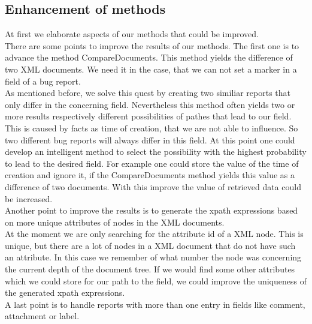 \subsection{Enhancement of methods}
At first we elaborate aspects of our methods that could be improved. \\
There are some points to improve the results of our methods. The first one is to advance the method CompareDocuments. This method yields the difference of two XML documents. We need it in the case, that we can not set a marker in a field of a bug report. \\ As mentioned before, we solve this quest by creating two similiar reports that only differ in the concerning field. Nevertheless this method often yields two or more results respectively different possibilities of pathes that lead to our field. This is caused by facts as time of creation, that we are not able to influence. So two different bug reports will always differ in this field. At this point one could develop an intelligent method to select the possibility with the highest probability to lead to the desired field. For example one could store the value of the time of creation and ignore it, if the CompareDocuments method yields this value as a difference of two documents. With this improve the value of retrieved data could be increased.
\\ Another point to improve the results is to generate the xpath expressions based on more unique attributes of nodes in the XML documents. \\
At the moment we are only searching for the attribute id of a XML node. This is unique, but there are a lot of nodes in a XML document that do not have such an attribute. In this case we remember of what number the node was concerning the current depth of the document tree. If we would find some other attributes which we could store for our path to the field, we could improve the uniqueness of the generated xpath expressions.\\
A last point is to handle reports with more than one entry in fields like comment, attachment or label. 

